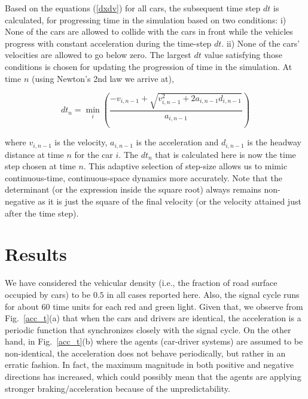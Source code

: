\documentclass[conference]{IEEEtran}
\begin{document}
Based on the equations (\ref{dxdv}) for all cars, the subsequent time step $dt$ is calculated, for progressing time in the simulation based on two conditions: i) None of the cars are allowed to collide with the cars in front while the vehicles progress with constant acceleration during the time-step $dt$. ii) None of the cars' velocities are allowed to go below zero. The largest $dt$ value satisfying those conditions is chosen for updating the progression of time in the simulation. At time $n$ (using Newton's 2nd law we arrive at),

\begin{equation}
    dt_{n} = \min_{i}\left( \frac{-v_{i,n-1} + \sqrt{v_{i,n-1}^2 + 2a_{i,n-1}d_{i,n-1}}}{a_{i,n-1}}\right)
\end{equation}

where $v_{i,n-1}$ is the velocity, $a_{i,n-1}$ is the acceleration and $d_{i,n-1}$ is the headway distance at time $n$ for the car $i$. The $dt_{n}$ that is calculated here is now the time step chosen at time $n$. This adaptive selection of step-size allows us to mimic continuous-time, continuous-space dynamics more accurately. Note that the determinant (or the expression inside the square root) always remains non-negative as it is just the square of the final velocity (or the velocity attained just after the time step).

\section{Results}

We have considered the vehicular density (i.e., the fraction of road
surface occupied by cars) to be $0.5$ in all cases reported here.
Also, the signal cycle runs for about 60 time units for each red and green
light. Given that, we observe from Fig.~\ref{acc_t}(a) that when the
cars and drivers are identical, the acceleration is a periodic
function that synchronizes closely with the signal cycle. On the other hand,
in Fig.~\ref{acc_t}(b) where the agents (car-driver systems) are assumed to be non-identical, the acceleration does not behave periodically, but rather in an erratic fashion. In fact, the maximum magnitude in both positive and negative directions has increased, which could possibly mean that the agents are applying stronger braking/acceleration because of the unpredictability. %
\end{document}
